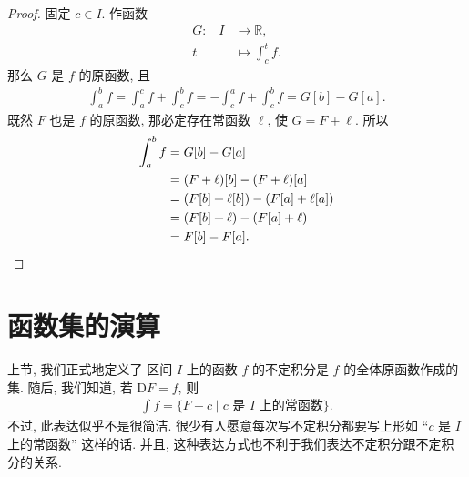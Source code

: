 \begin{proof}
    固定 $c \in I$.
    作函数
    \begin{align*}
        \text{$G$:} \quad
        I & \to \mathbb{R},           \\
        t & \mapsto \int_{c}^{t} {f}.
    \end{align*}
    那么 $G$ 是 $f$ 的原函数, 且
    \begin{align*}
        \int_{a}^{b} {f}
        = \int_{a}^{c} {f} + \int_{c}^{b} {f}
        = -\int_{c}^{a} {f} + \int_{c}^{b} {f}
        = G[b] - G[a].
    \end{align*}
    既然 $F$ 也是 $f$ 的原函数,
    那必定存在常函数 $\ell$, 使 $G = F + \ell$.
    所以
    \begin{align*}
        \int_{a}^{b} {f}
        = {} & G[b] - G[a]                         \\
        = {} & (F + \ell)[b] - (F + \ell)[a]       \\
        = {} & (F[b] + \ell[b]) - (F[a] + \ell[a]) \\
        = {} & (F[b] + \ell) - (F[a] + \ell)       \\
        = {} & F[b] - F[a]. \qedhere
    \end{align*}
\end{proof}

\section{函数集的演算}

上节, 我们正式地定义了%
区间 $I$ 上的函数 $f$ 的不定积分是 $f$ 的全体原函数作成的集.
随后, 我们知道, 若 $\mathrm{D}F = f$, 则
\begin{align*}
    \int {f} = \{ F + c \mid \text{$c$ 是 $I$ 上的常函数} \}.
\end{align*}
不过, 此表达似乎不是很简洁.
很少有人愿意每次写不定积分都要写上形如
``$c$ 是 $I$ 上的常函数'' 这样的话.
并且, 这种表达方式也不利于我们表达不定积分跟不定积分的关系.

